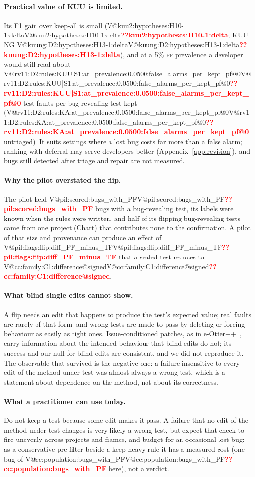 \documentclass[pdflatex,iicol,sn-mathphys-num]{sn-jnl}
\makeatletter
\newcommand{\V}[1]{\ifcsname V@#1\endcsname\csname V@#1\endcsname\else\textbf{\textcolor{red}{??#1}}\fi}
\newcommand{\PF}{\textsc{pf}}
\makeatother
\begin{document}
\paragraph{Practical value of KUU is limited.} Its F1 gain over keep-all is small (\V{kuu2:hypotheses:H10-1:delta}; KUU-NG \V{kuung:D2:hypotheses:H13-1:delta}), and at a 5\% \PF{} prevalence a developer would still read about \V{rv11:D2:rules:KUU|S1:at_prevalence:0.0500:false_alarms_per_kept_pf@0} test faults per bug-revealing test kept (\V{rv11:D2:rules:KA:at_prevalence:0.0500:false_alarms_per_kept_pf@0} untriaged). It suits settings where a lost bug costs far more than a false alarm; ranking with deferral may serve developers better (Appendix~\ref{app:revision}), and bugs still detected after triage and repair are not measured.

\paragraph{Why the pilot overstated the flip.} The pilot held \V{pil:scored:bugs_with_PF} bugs with a bug-revealing test, its labels were known when the rules were written, and half of its flipping bug-revealing tests came from one project (Chart) that contributes none to the confirmation. A pilot of that size and provenance can produce an effect of \V{pil:flags:flip:diff_PF_minus_TF} that a sealed test reduces to \V{cc:family:C1:difference@signed}.

\paragraph{What blind single edits cannot show.} A flip needs an edit that happens to produce the test's expected value; real faults are rarely of that form, and wrong tests are made to pass by deleting or forcing behaviour as easily as right ones. Issue-conditioned patches, as in e-Otter++~\cite{ahmed2026eotter}, carry information about the intended behaviour that blind edits do not; its success and our null for blind edits are consistent, and we did not reproduce it. The observable that survived is the negative one: a failure insensitive to every edit of the method under test was almost always a wrong test, which is a statement about dependence on the method, not about its correctness.

\paragraph{What a practitioner can use today.} Do not keep a test because some edit makes it pass. A failure that no edit of the method under test changes is very likely a wrong test, but expect that check to fire unevenly across projects and frames, and budget for an occasional lost bug: as a conservative pre-filter beside a keep-heavy rule it has a measured cost (one bug of \V{cc:population:bugs_with_PF} here), not a verdict.
\end{document}
